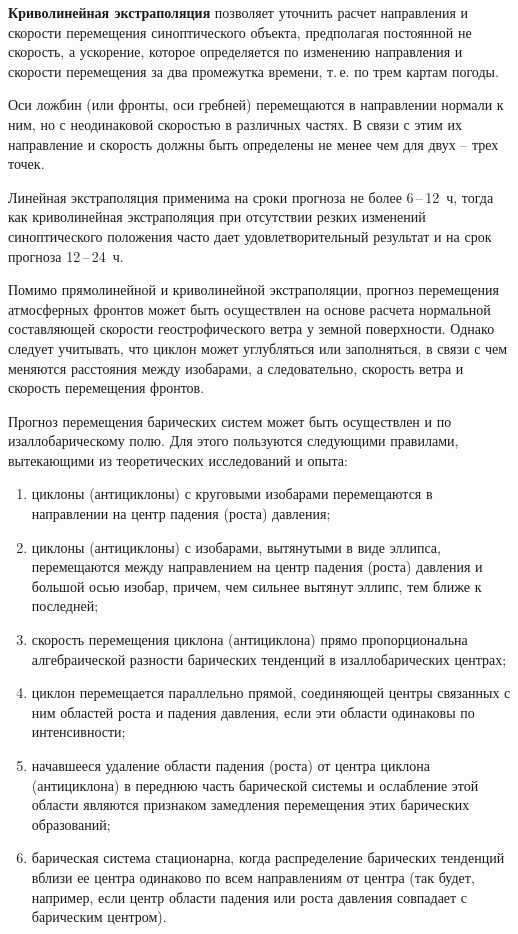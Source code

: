 \documentclass[a4paper, 12pt, twoside, final, book, russian, fittopage, cyremdash, openright]{ncc}
\newcommand{\otdo}{\,--\,}
\begin{document}
\textbf{Криволинейная экстраполяция} позволяет уточнить расчет направления и скорости
перемещения синоптического объекта, предполагая постоянной не
скорость, а ускорение, которое определяется по изменению направления и
скорости перемещения за два промежутка времени, т.\,е. по трем картам
погоды.

Оси ложбин (или фронты, оси гребней) перемещаются в направлении
нормали к ним, но с неодинаковой скоростью в различных частях. В связи
с этим их направление и скорость должны быть определены не менее чем
для двух -- трех точек.

Линейная экстраполяция применима на сроки прогноза не более 6\otdo12~ч,
тогда как криволинейная экстраполяция при отсутствии резких изменений
синоптического положения часто дает удовлетворительный результат и на
срок прогноза 12\otdo24~ч.

Помимо прямолинейной и криволинейной экстраполяции, прогноз
перемещения атмосферных фронтов может быть осуществлен на основе
расчета нормальной составляющей скорости геострофического ветра у
земной поверхности. Однако следует учитывать, что циклон может
углубляться или заполняться, в связи с чем меняются расстояния между
изобарами, а следовательно, скорость ветра и скорость перемещения
фронтов.

Прогноз перемещения барических систем может быть осуществлен и по
изаллобарическому полю. Для этого пользуются следующими правилами,
вытекающими из теоретических исследований и опыта:
\begin{enumerate}[label={\textbullet~}]
\item циклоны (антициклоны) с круговыми изобарами перемещаются в
  направлении на центр падения (роста) давления;
\item циклоны (антициклоны) с изобарами, вытянутыми в виде эллипса,
  перемещаются между направлением на центр падения (роста) давления и
  большой осью изобар, причем, чем сильнее вытянут эллипс, тем ближе к
  последней;
\item скорость перемещения циклона (антициклона) прямо пропорциональна
  алгебраической разности барических тенденций в изаллобарических
  центрах;
\item циклон перемещается параллельно прямой, соединяющей центры
  связанных с ним областей роста и падения давления, если эти области
  одинаковы по интенсивности;
\item начавшееся удаление области падения (роста) от центра циклона
  (антициклона) в переднюю часть барической системы и ослабление этой
  области являются признаком замедления перемещения этих барических
  образований;
\item барическая система стационарна, когда распределение барических
  тенденций вблизи ее центра одинаково по всем направлениям от центра
  (так будет, например, если центр области падения или роста давления
  совпадает с барическим центром).
\end{enumerate}
\end{document}
